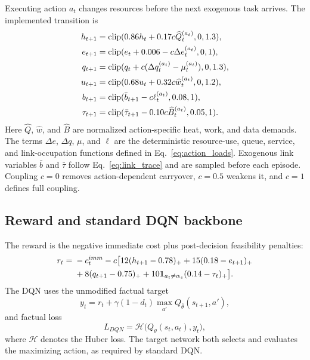 \documentclass[11pt]{article}
\DeclareMathOperator{\clip}{clip}
\begin{document}
Executing action $a_t$ changes resources before the next exogenous task arrives. The implemented transition is
\begin{align}
h_{t+1}&=\clip(0.86h_t+0.17c\widehat Q_t^{(a_t)},0,1.3),\notag\\
e_{t+1}&=\clip(e_t+0.006-c\Delta e_t^{(a_t)},0,1),\notag\\
q_{t+1}&=\clip(q_t+c(\Delta q_t^{(a_t)}-\mu_t^{(a_t)}),0,1.3),\notag\\
u_{t+1}&=\clip(0.68u_t+0.32c\widehat w_t^{(a_t)},0,1.2),\notag\\
b_{t+1}&=\clip(\bar b_{t+1}-c\ell_t^{(a_t)},0.08,1),\notag\\
\tau_{t+1}&=\clip(\bar\tau_{t+1}-0.10c\widehat B_t^{(a_t)},0.05,1).
\label{eq:transition}
\end{align}
Here $\widehat Q$, $\widehat w$, and $\widehat B$ are normalized action-specific heat, work, and data demands. The terms $\Delta e$, $\Delta q$, $\mu$, and $\ell$ are the deterministic resource-use, queue, service, and link-occupation functions defined in Eq.~\eqref{eq:action_loads}. Exogenous link variables $\bar b$ and $\bar\tau$ follow Eq.~\eqref{eq:link_trace} and are sampled before each episode. Coupling $c=0$ removes action-dependent carryover, $c=0.5$ weakens it, and $c=1$ defines full coupling.

\subsection{Reward and standard DQN backbone}

The reward is the negative immediate cost plus post-decision feasibility penalties:
\begin{align}
r_t={}&-c_t^{imm}-c\big[12(h_{t+1}-0.78)_+ +15(0.18-e_{t+1})_+\notag\\
&+8(q_{t+1}-0.75)_+ +10\mathbf 1_{a_t\ne\alpha_s}(0.14-\tau_t)_+\big].
\label{eq:reward}
\end{align}
The DQN uses the unmodified factual target
\begin{equation}
y_t=r_t+\gamma(1-d_t)\max_{a'}Q_{\bar\theta}(s_{t+1},a'),
\label{eq:factual}
\end{equation}
and factual loss
\begin{equation}
L_{DQN}=\mathcal H\big(Q_\theta(s_t,a_t),y_t\big),
\end{equation}
where $\mathcal H$ denotes the Huber loss. The target network both selects and evaluates the maximizing action, as required by standard DQN.
\end{document}
